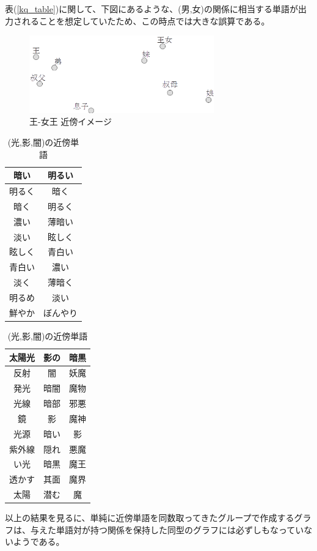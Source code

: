 \newpage

表(\ref{kq_table})に関して、下図にあるような、(男,女)の関係に相当する単語が出力されることを想定していたため、この時点では大きな誤算である。
\begin{figure}[h]
  \centering
  \includegraphics[width=8cm]{../images/kq_fv.eps}
  \caption{王-女王 近傍イメージ}
  \label{kq_fv}
\end{figure}

\begin{table}[h]
  \begin{minipage}[t]{.33\textwidth}
    \caption[(明るい,暗い)]{(明るい,暗い)の近傍単語}
    \begin{center}
      \begin{tabular}{|c|c|} \hline
        暗い & 明るい \\ \hline
        明るく & 暗く \\
        暗く & 明るく \\
        濃い & 薄暗い \\
        淡い & 眩しく \\
        眩しく & 青白い \\
        青白い & 濃い \\
        淡く & 薄暗く \\
        明るめ & 淡い \\
        鮮やか & ぼんやり \\ \hline
      \end{tabular}
    \end{center}
  \end{minipage}
  \begin{minipage}[t]{.66\textwidth}
    \caption[(光,影,闇)]{(光,影,闇)の近傍単語}
    \begin{center}
      \begin{tabular}{|c|c|c|} \hline
        太陽光 & 影の & 暗黒 \\ \hline
        反射 & 闇 & 妖魔 \\
        発光 & 暗闇 & 魔物 \\
        光線 & 暗部 & 邪悪 \\
        鏡 & 影 & 魔神 \\
        光源 & 暗い & 影 \\
        紫外線 & 隠れ & 悪魔 \\
        い光 & 暗黒 & 魔王 \\
        透かす & 其面 & 魔界 \\
        太陽 & 潜む & 魔 \\ \hline
      \end{tabular}
    \end{center}
  \end{minipage}
\end{table}
以上の結果を見るに、単純に近傍単語を同数取ってきたグループで作成するグラフは、与えた単語対が持つ関係を保持した同型のグラフには必ずしもなっていないようである。
